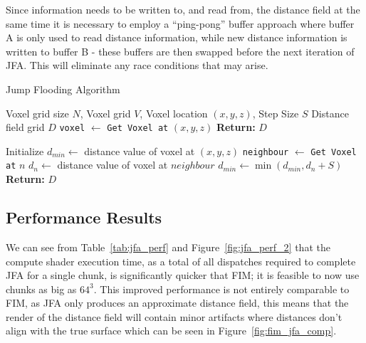 Since information needs to be written to, and read from, the distance field at the same time it is necessary to employ
a ``ping-pong'' buffer approach where buffer A is only used to read distance information, while new distance information
is written to buffer B - these buffers are then swapped before the next iteration of JFA. This will eliminate any race
conditions that may arise.

\begin{algorithm}[H]
    \caption{Jump Flooding Algorithm}
    \label{alg:jfa}
    \begin{algorithmic}[1]
        \REQUIRE Voxel grid size \(N\), Voxel grid \(V\), Voxel location \((x, y, z)\), Step Size \(S\)
        \ENSURE Distance field grid \(D\)
        \STATE \texttt{voxel} $\gets$ \texttt{Get Voxel at} \((x, y, z)\)
        \STATE \textbf{Return:} \(D\)
        \ENDIF

        \STATE Initialize $d_{min} \gets$ distance value of voxel at \((x, y, z)\)
        \STATE \texttt{neighbour} $\gets$ \texttt{Get Voxel at} $n$
        \STATE $d_{n} \gets$ distance value of voxel at $neighbour$
        \STATE $d_{min} \gets \min(d_{min}, d_n + S)$
        \ENDFOR
        \STATE \textbf{Return:} \(D\)
    \end{algorithmic}
\end{algorithm}

\subsection{Performance Results}
We can see from Table~\ref{tab:jfa_perf} and Figure~\ref{fig:jfa_perf_2} that the compute shader execution time, as a
total of all dispatches required to complete JFA for a single chunk, is significantly quicker that FIM; it is feasible
to now use chunks as big as \(64^3\). This improved performance is not entirely comparable to FIM, as JFA only produces
an approximate distance field, this means that the render of the distance field will contain minor artifacts where
distances don't align with the true surface which can be seen in Figure~\ref{fig:fim_jfa_comp}.

